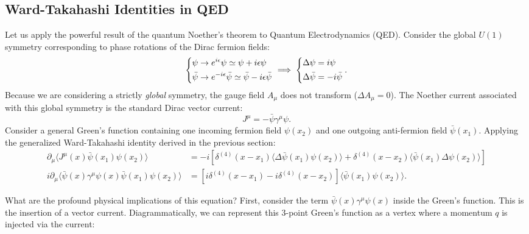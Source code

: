 \subsection{Ward-Takahashi Identities in QED}

Let us apply the powerful result of the quantum Noether's theorem to Quantum Electrodynamics (QED). Consider the global $U(1)$ symmetry corresponding to phase rotations of the Dirac fermion fields:
\[
    \begin{dcases}
        \psi \to e^{i\epsilon} \psi \simeq \psi + i\epsilon\psi \\
        \bar{\psi} \to e^{-i\epsilon} \bar{\psi} \simeq \bar{\psi} - i\epsilon\bar{\psi}
    \end{dcases}
    \implies
    \begin{dcases}
        \Delta\psi = i\psi \\
        \Delta\bar{\psi} = -i\bar{\psi}
    \end{dcases} .
\]
Because we are considering a strictly \textit{global} symmetry, the gauge field $A_\mu$ does not transform ($\Delta A_\mu = 0$).
The Noether current associated with this global symmetry is the standard Dirac vector current:
\[
    J^\mu = -\bar{\psi} \gamma^\mu \psi.
\]
Consider a general Green's function containing one incoming fermion field $\psi(x_2)$ and one outgoing anti-fermion field $\bar{\psi}(x_1)$. Applying the generalized Ward-Takahashi identity derived in the previous section:
\[
    \begin{aligned}
        \partial_\mu \langle J^\mu(x) \bar{\psi}(x_1) \psi(x_2) \rangle                          & = -i \left[ \delta^{(4)}(x - x_1) \langle \Delta\bar{\psi}(x_1) \psi(x_2) \rangle + \delta^{(4)}(x - x_2) \langle \bar{\psi}(x_1) \Delta\psi(x_2) \rangle \right] \\
        i\partial_\mu \langle \bar{\psi}(x) \gamma^\mu \psi(x) \bar{\psi}(x_1) \psi(x_2) \rangle & = \left[ i\delta^{(4)}(x - x_1) - i\delta^{(4)}(x - x_2) \right] \langle \bar{\psi}(x_1) \psi(x_2) \rangle.
    \end{aligned}
\]

What are the profound physical implications of this equation?
First, consider the term $\bar{\psi}(x)\gamma^\mu\psi(x)$ inside the Green's function. This is the insertion of a vector current. Diagrammatically, we can represent this 3-point Green's function as a vertex where a momentum $q$ is injected via the current:


